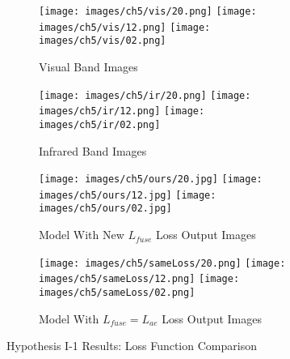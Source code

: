 \begin{figure}[htbp]
    \centering
    \begin{subfigure}[b]{\textwidth}
        \texttt{[image: images/ch5/vis/20.png]}
        \texttt{[image: images/ch5/vis/12.png]}
        \texttt{[image: images/ch5/vis/02.png]}
        \caption{Visual Band Images}
        \label{fig:ch5:met2:vis}
    \end{subfigure}
    \vspace{0.01cm}
    \begin{subfigure}[b]{\textwidth}
        \texttt{[image: images/ch5/ir/20.png]}
        \texttt{[image: images/ch5/ir/12.png]}
        \texttt{[image: images/ch5/ir/02.png]}
        \caption{Infrared Band Images}
        \label{fig:ch5:met2:ir}
    \end{subfigure}
    \vspace{0.01cm}
    \begin{subfigure}[b]{\textwidth}
        \texttt{[image: images/ch5/ours/20.jpg]}
        \texttt{[image: images/ch5/ours/12.jpg]}
        \texttt{[image: images/ch5/ours/02.jpg]}
        \caption{Model With New $L_{fuse}$ Loss Output Images}
        \label{fig:ch5:met2:ours}
    \end{subfigure}
    \vspace{0.01cm}
    \begin{subfigure}[b]{\textwidth}
        \texttt{[image: images/ch5/sameLoss/20.png]}
        \texttt{[image: images/ch5/sameLoss/12.png]}
        \texttt{[image: images/ch5/sameLoss/02.png]}
        \caption{Model With $ L_{fuse} = L_{ae}$ Loss Output Images}
        \label{fig:ch5:met2:sameLoss}
    \end{subfigure}
    \caption{Hypothesis I-1 Results: Loss Function Comparison}
    \label{fig:ch5:met2}
\end{figure}

